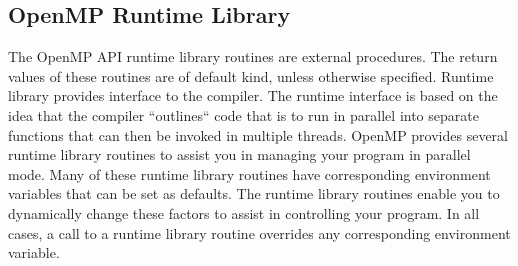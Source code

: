 {\subsection{OpenMP Runtime Library}
The OpenMP API runtime library routines are external procedures. The return values of these routines are of default kind, unless otherwise specified. Runtime library provides interface to the compiler. The runtime interface is based on the idea that the compiler ``outlines`` code that is to run in parallel into separate functions that can then be invoked in multiple threads. OpenMP provides several runtime library routines to assist you in managing your program in parallel mode. Many of these runtime library routines have corresponding environment variables that can be set as defaults. The runtime library routines enable you to dynamically change these factors to assist in controlling your program. In all cases, a call to a runtime library routine overrides any corresponding environment variable. 

}
